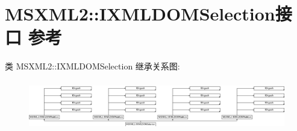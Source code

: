 \hypertarget{interface_m_s_x_m_l2_1_1_i_x_m_l_d_o_m_selection}{}\section{M\+S\+X\+M\+L2\+:\+:I\+X\+M\+L\+D\+O\+M\+Selection接口 参考}
\label{interface_m_s_x_m_l2_1_1_i_x_m_l_d_o_m_selection}
类 M\+S\+X\+M\+L2\+:\+:I\+X\+M\+L\+D\+O\+M\+Selection 继承关系图\+:\begin{figure}[H]
\begin{center}
\leavevmode
\includegraphics[height=2.198953cm]{interface_m_s_x_m_l2_1_1_i_x_m_l_d_o_m_selection}
\end{center}
\end{figure}
